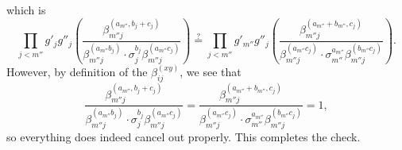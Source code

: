 \documentclass{article}
\numberwithin{equation}{section}
\begin{document}
which is
\[\prod_{j<m''}
g'_jg''_j\left(\frac{\beta_{m''j}^{(a_{m''},b_j+c_j)}}
{\beta_{m''j}^{(a_{m''}b_j)}\cdot
\sigma_j^{b_j}\beta_{m''j}^{(a_{m''}c_j)}}\right)
\stackrel?=\prod_{j<m''}
g'_{m''}g''_j\left(\frac{\beta_{m''j}^{(a_{m''}+b_{m''},c_j)}}
{\beta_{m''j}^{(a_{m''}c_j)}\cdot
\sigma_{m''}^{a_{m''}}\beta_{m''j}^{(b_{m''}c_j)}}\right).\]
However, by definition of the $\beta_{ij}^{(xy)}$, we see that
\[\frac{\beta_{m''j}^{(a_{m''},b_j+c_j)}}
{\beta_{m''j}^{(a_{m''}b_j)}\cdot
\sigma_j^{b_j}\beta_{m''j}^{(a_{m''}c_j)}}=\frac{\beta_{m''j}^{(a_{m''}+b_{m''},c_j)}}
{\beta_{m''j}^{(a_{m''}c_j)}\cdot
\sigma_{m''}^{a_{m''}}\beta_{m''j}^{(b_{m''}c_j)}}=1,\]
so everything does indeed cancel out properly. This completes the check.
\end{document}
